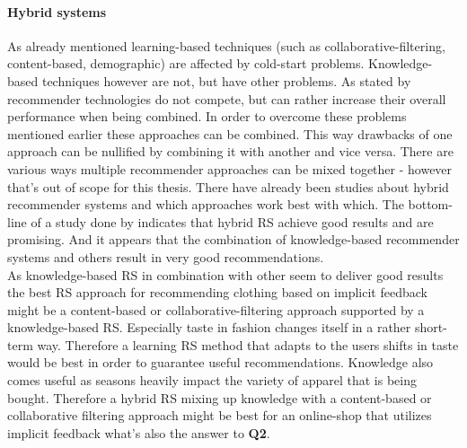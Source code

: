 \paragraph{Hybrid systems}
As already mentioned learning-based techniques (such as collaborative-filtering, content-based, demographic) are affected by cold-start problems.
Knowledge-based techniques however are not, but have other problems.
As stated by \citeauthor{herlocker:2000} recommender technologies do not compete, but can rather increase their overall performance when being combined.\citep[p.~241]{herlocker:2000}
In order to overcome these problems mentioned earlier these approaches can be combined.
This way drawbacks of one approach can be nullified by combining it with another and vice versa.
There are various ways multiple recommender approaches can be mixed together - however that's out of scope for this thesis.
\citep[p.~378-380]{burke:2007}
There have already been studies about hybrid recommender systems and which approaches work best with which.
The bottom-line of a study done by \citeauthor{burke:2007} indicates that hybrid RS achieve good results and are promising.
And it appears that the combination of knowledge-based recommender systems and others result in very good recommendations.
\citep[p.~405-406]{burke:2007}
\\

As knowledge-based RS in combination with other seem to deliver good results the best RS approach for recommending clothing based on implicit feedback might be a content-based or collaborative-filtering approach supported by a knowledge-based RS.
Especially taste in fashion changes itself in a rather short-term way.
Therefore a learning RS method that adapts to the users shifts in taste would be best in order to guarantee useful recommendations.
Knowledge also comes useful as seasons heavily impact the variety of apparel that is being bought.
Therefore a hybrid RS mixing up knowledge with a content-based or collaborative filtering approach might be best for an online-shop that utilizes implicit feedback what's also the answer to \textbf{Q2}.

